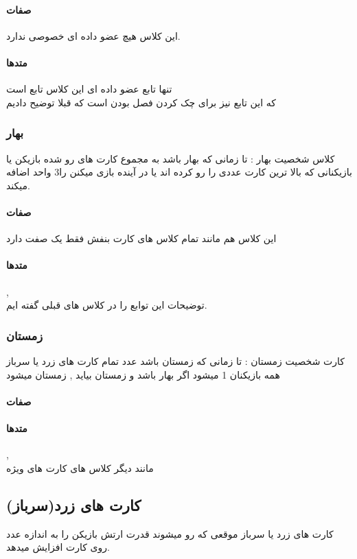 \documentclass[pdf,titlepage,a4paper]{report}
\begin{document}
	\paragraph{صفات}
	این کلاس هیچ عضو داده ای خصوصی ندارد.
	\paragraph{متدها}
	تنها تابع عضو داده ای این کلاس تابع  است \\ 
	که این تابع نیز برای چک کردن فصل بودن است که قبلا توضیح دادیم
	
	\subsubsection{بهار}
	 کلاس شخصیت بهار : تا زمانی که بهار باشد به مجموع کارت های رو شده بازیکن یا بازیکنانی که بالا ترین کارت عددی را رو کرده اند یا  در آینده بازی میکنن را3 واحد اضافه میکند.

	\paragraph{صفات}
	این کلاس هم مانند تمام کلاس های کارت بنفش فقط یک صفت  دارد
	\paragraph{متدها}
	 ,  \\
	توضیحات این توابع را در کلاس های قبلی گفته ایم.

	\subsubsection{زمستان}
	کارت شخصیت زمستان : تا زمانی که زمستان باشد عدد تمام کارت های زرد یا سرباز همه بازیکنان 1 میشود اگر بهار باشد و زمستان بیاید , زمستان میشود
	\paragraph{صفات}
	\paragraph{متدها}
	 ,  \\
	مانند دیگر کلاس های کارت های ویژه

	\subsection{کارت های زرد(سرباز)}
	کارت های زرد یا سرباز موقعی که رو میشوند قدرت ارتش بازیکن را به اندازه عدد روی کارت افزایش میدهد.
\end{document}
